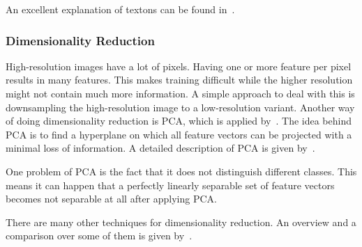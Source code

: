 An excellent explanation of textons can be found in~\cite{zhu2005textons}.


\subsubsection{Dimensionality Reduction}
High-resolution images have a lot of pixels. Having one or more feature per
pixel results in many features. This makes training difficult while the higher
resolution might not contain much more information. A simple approach to deal
with this is downsampling the high-resolution image to a low-resolution
variant. Another way of doing dimensionality reduction is \gls{PCA}, which is
applied by~\cite{chen2011pixel}. The idea behind \gls{PCA} is to find a
hyperplane on which all feature vectors can be projected with a minimal loss of
information. A detailed description of \gls{PCA} is given
by~\cite{smith2002tutorial}.

One problem of \gls{PCA} is the fact that it does not distinguish different
classes. This means it can happen that a perfectly linearly separable set of
feature vectors becomes not separable at all after applying \gls{PCA}.

There are many other techniques for dimensionality reduction. An overview and
a comparison over some of them is given by~\cite{van2009dimensionality}.
